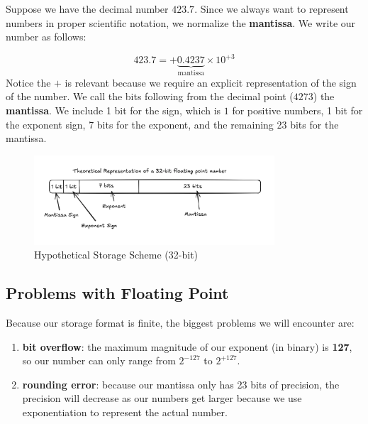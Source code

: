Suppose we have the decimal number $423.7$. Since we always want to represent
numbers in proper scientific notation, we normalize the
\textbf{mantissa}.
We write our number as follows:

\begin{equation*}
  423.7 = +\underbrace{0.4237}_{\text{mantissa}} \times 10^{+3}
\end{equation*}
Notice the $+$ is relevant because we require an explicit representation of the
sign of the number. We call the bits following from the decimal point ($4273$) 
the \textbf{mantissa}.
We include 1 bit for the sign, which is $1$ for positive numbers, 1 bit for the
exponent sign, 7 bits for the exponent, and the remaining 23 bits for the
mantissa.

\begin{figure}[h]
  \centering
  \includegraphics[width=0.8\textwidth]{./assets/fake_ieee754.png}
  \caption{Hypothetical Storage Scheme (32-bit)}
\end{figure}

\subsection{Problems with Floating Point}
\noindent
\begin{minipage}{\textwidth}
Because our storage format is finite, the biggest problems we will encounter
are:
\begin{enumerate}
  \item \textbf{bit overflow}: the maximum magnitude of our exponent (in binary)
    is \textbf{127}, so our number can only range from $2^{-127}$ to $2^{+127}$.
  \item \textbf{rounding error}: because our mantissa only has 23 bits of 
    precision, the precision will decrease as our numbers get larger because we 
    use exponentiation to represent the actual number.
\end{enumerate}
\end{minipage}


